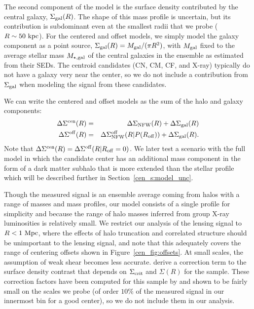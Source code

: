 The second component of the model is the surface density contributed by
the central galaxy, $\Sigma_{\rm gal}(R)$. The shape of this mass
profile is uncertain, but its contribution is subdominant even
at the smallest radii that we probe ($R\sim50~{\rm
  kpc}$). For the centered and offset models, we simply
model the galaxy component as a point source, $\Sigma_{\rm gal}(R)=M_{\rm gal}/(\pi
R^2)$, with $M_{\rm gal}$ fixed to the average stellar mass $M_{\rm
  \star,gal}$ of the central galaxies in the ensemble as estimated
from their SEDs. The centroid candidates (CN, CM, CF, and
X-ray) typically do not have a galaxy very near the center, so we do
not include a contribution from $\Sigma_{\rm gal}$ when modeling the
signal from these candidates.

We can write the centered and offset models as the sum of the halo and
galaxy components:
\begin{eqnarray}
\Delta\Sigma^{\rm cen}(R) &=& \Delta\Sigma_{\rm NFW}(R) + \Delta\Sigma_{\rm gal}(R) \\
\Delta\Sigma^{\rm off}(R) &=& \Delta\Sigma_{\rm NFW}^{\rm off}(R|P(R_{\rm off})) + \Delta\Sigma_{\rm gal}(R).
\end{eqnarray}
Note that $\Delta\Sigma^{\rm cen}(R)=\Delta\Sigma^{\rm off}(R|R_{\rm
  off}=0)$.  We later test a scenario with the full model in which the
candidate center has an additional mass component in the form of a
dark matter subhalo that is more extended than the stellar profile
which will be described further in Section~\ref{cen_s:model_unc}.

Though the measured signal is an
ensemble average coming from halos with a range of masses and mass
profiles, our model consists of a single profile for simplicity and
because the range of halo masses inferred from group X-ray
luminosities is relatively small. We restrict our analysis of the
lensing signal to $R<1~{\rm Mpc}$, where the effects of halo
truncation and correlated structure should be unimportant to the
lensing signal, and note that this adequately covers the range of
centering offsets shown in Figure~\ref{cen_fig:offsets}.
At small scales, the assumption of weak shear becomes less
accurate. \citet{Mandelbaum2006b} derive a correction term to the
surface density contrast that depends on $\Sigma_{\rm crit}$ and
$\Sigma(R)$ for the sample. These correction factors have been
computed for this sample by \citet{Leauthaud2010} and shown to be
fairly small on the scales we probe (of order $10\%$ of the measured
signal in our innermost bin for a good center), so we do not include
them in our analysis.

